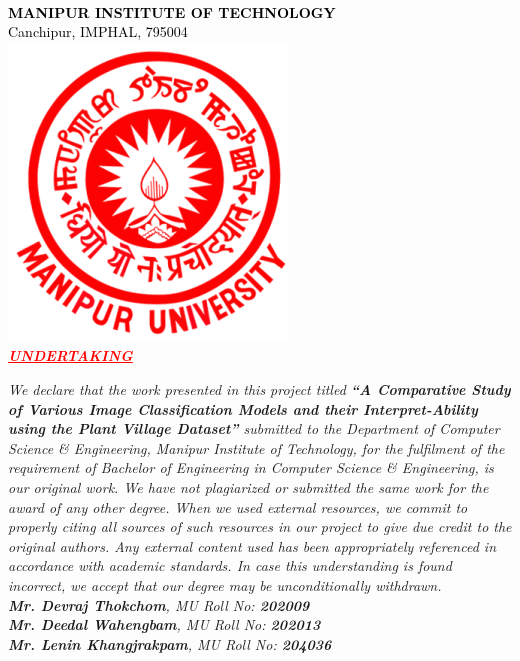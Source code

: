 \documentclass[12pt, oneside, a4paper]{book}
\begin{document}
\newpage
\begingroup
    \begin{center}
        \textcolor{black}
        {
        \color{red}\large {}\\
        \normalsize \textbf{MANIPUR INSTITUTE OF TECHNOLOGY}\\
        \normalsize Canchipur, IMPHAL, 795004\\[1em]
        \includegraphics[scale=0.4]{graphics/MU Logo.png}\\[0.5em]
        }
        \textcolor{red}
        {
        \large \textit{\underline{\textbf{UNDERTAKING}}}
        }
    \end{center}
\endgroup

\begingroup
    \begin{onehalfspace}   
    \textit{
    We declare that the work presented in this project titled \textbf{``A Comparative Study of Various Image Classification Models and their Interpret-Ability using the Plant Village Dataset''} submitted to the \textit{Department of Computer Science \& Engineering, Manipur Institute of Technology}, for the fulfilment of the requirement of Bachelor of Engineering in Computer Science \& Engineering, is our original work. We have not plagiarized or submitted the same work for the award of any other degree. When we used external resources, we commit to properly citing all sources of such resources in our project to give due credit to the original authors. Any external content used has been appropriately referenced in accordance with academic standards. In case this understanding is found incorrect, we accept that our degree may be unconditionally withdrawn.}\\[1em]
    \textit{\hspace*{4em}\textbf{Mr. Devraj Thokchom}, MU Roll No: \textbf{202009}\\
    \hspace*{4em}\textbf{Mr. Deedal Wahengbam}, MU Roll No: \textbf{202013}\\
    \hspace*{4em}\textbf{Mr. Lenin Khangjrakpam}, MU Roll No: \textbf{204036}}\\[1em]

    
    \end{onehalfspace}
\endgroup
\end{document}
